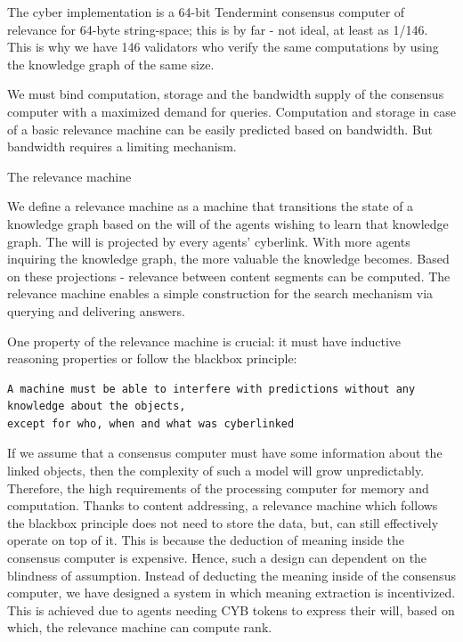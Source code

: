 \documentclass[8pt,oneside]{amsart}
\makeatletter
\renewcommand\subsection{\@startsection{subsection}
                                    {2}{\z@}
                                    {-3.25ex\@plus -1ex \@minus -.2ex}
                                    {0ex \@plus .2ex}
                                    {\play\Large}
                        }
\newcommand{\titleSection}[1]{\subsection{#1}}
\newcommand{\code}[1]{{\PlayBold #1}}
\makeatother
\begin{document}
The \code{cyber} implementation is a 64-bit Tendermint consensus computer of relevance for 64-byte string-space; this is by far - not ideal, at least as 1/146. This is why we have 146 validators who verify the same computations by using the knowledge graph of the same size.

We must bind computation, storage and the bandwidth supply of the consensus computer with a maximized demand for queries. Computation and storage in case of a basic \code{relevance machine} can be easily predicted based on bandwidth. But bandwidth requires a limiting mechanism.

\titleSection{The relevance machine}\label{relevance-machine}

We define a relevance machine as a machine that transitions the state of a knowledge graph based on the will of the agents wishing to learn that knowledge graph. The will is projected by every agents' cyberlink. With more agents inquiring the knowledge graph, the more valuable the knowledge becomes. Based on these projections - relevance between content segments can be computed. The relevance machine enables a simple construction for the search mechanism via querying and delivering answers.

One property of the relevance machine is crucial: it must have inductive reasoning properties or follow the blackbox principle:

\begin{lstlisting}
A machine must be able to interfere with predictions without any knowledge about the objects,
except for who, when and what was cyberlinked
\end{lstlisting}

If we assume that a consensus computer must have some information about the linked objects, then the complexity of such a model will grow unpredictably. Therefore, the high requirements of the processing computer for memory and computation. Thanks to content addressing, a relevance machine which follows the blackbox principle does not need to store the data, but, can still effectively operate on top of it. This is because the deduction of meaning inside the consensus computer is expensive. Hence, such a design can dependent on the blindness of assumption. Instead of deducting the meaning inside of the consensus computer, we have designed a system in which meaning extraction is incentivized. This is achieved due to agents needing CYB tokens to express their will, based on which, the relevance machine can compute rank.
\end{document}
